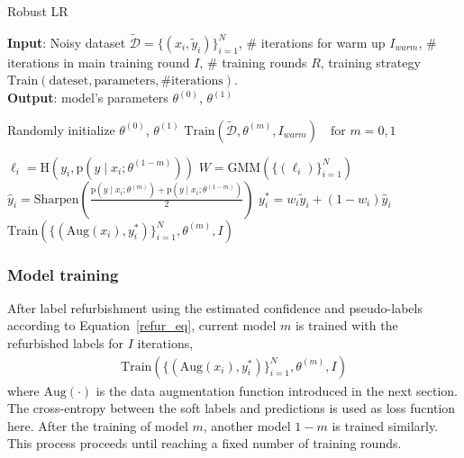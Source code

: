 \documentclass[letterpaper]{article} \usepackage{aaai23}  \usepackage{times}  \usepackage{helvet}  \usepackage{courier}  \usepackage[hyphens]{url}  \usepackage{graphicx} \urlstyle{rm} \def\UrlFont{\rm}  \usepackage{natbib}  \usepackage{caption} \frenchspacing  \setlength{\pdfpagewidth}{8.5in} \setlength{\pdfpageheight}{11in} \usepackage{algorithm}
\begin{document}
\begin{algorithm}
    \caption{Robust LR} 
    \label{alg}
    \textbf{Input}:
    Noisy dataset $\tilde{\mathcal{D}}=\{(x_i,\tilde{y}_i)\}^{N}_{i=1}$,
    \# iterations for warm up $I_{warm}$, 
    \# iterations in main training round $I$, 
    \# training rounds $R$, 
    training strategy $\text{Train}(\text{dateset},\text{parameters},\text{\# iterations})$.
    \\
    \textbf{Output}: model's parameters $\theta^{(0)}$, $\theta^{(1)}$ 
    \begin{algorithmic}[1] 
    \State Randomly initialize $\theta^{(0)}$, $\theta^{(1)}$
    \State $\text{Train}(\tilde{\mathcal{D}},\theta^{(m)},I_{warm}) \quad \text{for } m=0, 1$
    
                \State $\ell_i=\text{H}(y_i, \text{p}(y\mid x_i;\theta^{(1-m)}))$
                \State {}
            \EndFor
            \State $W=\text{GMM}(\{(\ell_i)\}_{i=1}^{N})$
                \State $\hat{y}_i=\text{Sharpen}(\frac{\text{p}(y\mid x_i;\theta^{(m)})+\text{p}(y\mid x_i;\theta^{(1-m)})}{2})$
                \State {}
                \State $y^*_i=w_i\tilde{y}_i+(1-w_i)\hat{y}_i$ 
            \EndFor
            \State $\text{Train}(\{(\text{Aug}(x_i),y_i^*)\}_{i=1}^N,\theta^{(m)},I)$
        \EndFor
    \EndFor

    \end{algorithmic} 
\end{algorithm}


\subsubsection{Model training}
After label refurbishment using the estimated confidence and pseudo-labels according to Equation~\ref{refur_eq}, current model $m$ is trained with the refurbished labels for $I$ iterations,
\begin{equation}
    \begin{gathered}
        \text{Train}(\{(\text{Aug}(x_i),y_i^*)\}_{i=1}^N,\theta^{(m)},I)
    \end{gathered}
\end{equation}
where $\text{Aug}(\cdot)$ is the data augmentation function introduced in the next section.
The cross-entropy between the soft labels and predictions is used as loss fucntion here.
After the training of model $m$, another model $1-m$ is trained similarly.
This process proceeds until reaching a fixed number of training rounds.
\end{document}
